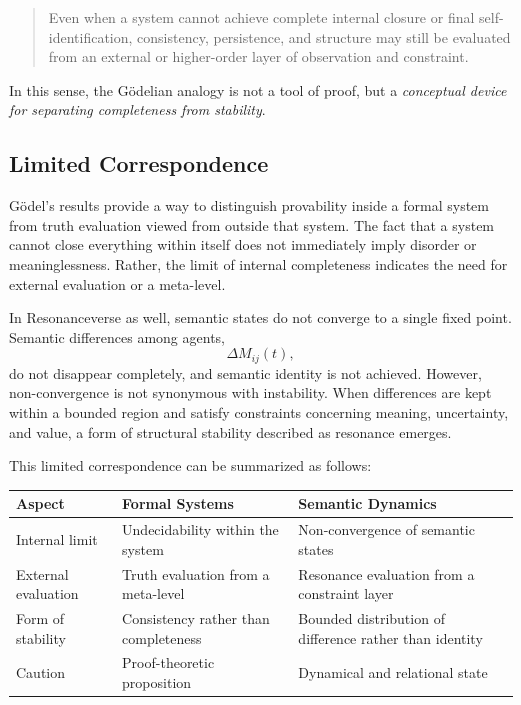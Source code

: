 \documentclass[11pt,a4paper]{article}
\theoremstyle{definition}
\begin{document}
\begin{quote}
Even when a system cannot achieve complete internal closure or final self-identification, consistency, persistence, and structure may still be evaluated from an external or higher-order layer of observation and constraint.
\end{quote}

In this sense, the G\"odelian analogy is not a tool of proof, but a \textit{conceptual device for separating completeness from stability}.

\subsection{Limited Correspondence}

G\"odel's results provide a way to distinguish provability inside a formal system from truth evaluation viewed from outside that system. The fact that a system cannot close everything within itself does not immediately imply disorder or meaninglessness. Rather, the limit of internal completeness indicates the need for external evaluation or a meta-level.

In Resonanceverse as well, semantic states do not converge to a single fixed point. Semantic differences among agents,
\[
\Delta M_{ij}(t),
\]
do not disappear completely, and semantic identity is not achieved. However, non-convergence is not synonymous with instability. When differences are kept within a bounded region and satisfy constraints concerning meaning, uncertainty, and value, a form of structural stability described as resonance emerges.

This limited correspondence can be summarized as follows:

\begin{table}[h]
\centering
\begin{tabular}{lll}
\hline
\textbf{Aspect} & \textbf{Formal Systems} & \textbf{Semantic Dynamics} \\
\hline
Internal limit & Undecidability within the system & Non-convergence of semantic states \\
External evaluation & Truth evaluation from a meta-level & Resonance evaluation from a constraint layer \\
Form of stability & Consistency rather than completeness & Bounded distribution of difference rather than identity \\
Caution & Proof-theoretic proposition & Dynamical and relational state \\
\hline
\end{tabular}
\end{table}
\end{document}
